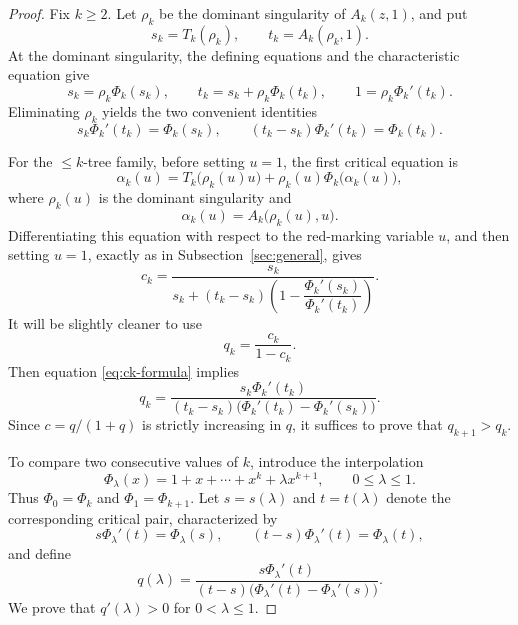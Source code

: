 \documentclass[11pt, onesided]{amsart}
\theoremstyle{remark}
\begin{document}
\begin{proof}
Fix $k\ge2$.  Let $\rho_k$ be the dominant singularity of $A_k(z,1)$, and put
\[
s_k=T_k(\rho_k),
\qquad
t_k=A_k(\rho_k,1).
\]
At the dominant singularity, the defining equations and the characteristic equation give
\begin{equation}
\label{eq:bounded-critical}
s_k=\rho_k\Phi_k(s_k),
\qquad
t_k=s_k+\rho_k\Phi_k(t_k),
\qquad
1=\rho_k\Phi_k'(t_k).
\end{equation}
Eliminating $\rho_k$ yields the two convenient identities
\begin{equation}
\label{eq:bounded-critical2}
s_k\Phi_k'(t_k)=\Phi_k(s_k),
\qquad
(t_k-s_k)\Phi_k'(t_k)=\Phi_k(t_k).
\end{equation}

For the $\leq k$-tree family, before setting $u=1$, the first critical equation is
\[
\alpha_k(u)
=
T_k\bigl(\rho_k(u)u\bigr)
+
\rho_k(u)\Phi_k\bigl(\alpha_k(u)\bigr),
\]
where $\rho_k(u)$ is the dominant singularity and
\[
\alpha_k(u)=A_k\bigl(\rho_k(u),u\bigr).
\]
Differentiating this equation with respect to the red-marking variable $u$, and then setting $u=1$, exactly as in Subsection~\ref{sec:general}, gives
\begin{equation}
\label{eq:ck-formula}
c_k=
\frac{s_k}
{s_k+(t_k-s_k)\left(1-\dfrac{\Phi_k'(s_k)}{\Phi_k'(t_k)}\right)}.
\end{equation}
It will be slightly cleaner to use
\[
q_k=\frac{c_k}{1-c_k}.
\]
Then equation \eqref{eq:ck-formula} implies
\begin{equation}
\label{eq:qk-formula}
q_k=
\frac{s_k\Phi_k'(t_k)}
{(t_k-s_k)\bigl(\Phi_k'(t_k)-\Phi_k'(s_k)\bigr)}.
\end{equation}
Since $c=q/(1+q)$ is strictly increasing in $q$, it suffices to prove that $q_{k+1}>q_k$.

To compare two consecutive values of $k$, introduce the interpolation
\[
\Phi_\lambda(x)=1+x+\cdots+x^k+\lambda x^{k+1},
\qquad 0\le\lambda\le1.
\]
Thus $\Phi_0=\Phi_k$ and $\Phi_1=\Phi_{k+1}$.  Let $s=s(\lambda)$ and $t=t(\lambda)$ denote the corresponding critical pair, characterized by
\begin{equation}
\label{eq:lambda-critical}
s\Phi_\lambda'(t)=\Phi_\lambda(s),
\qquad
(t-s)\Phi_\lambda'(t)=\Phi_\lambda(t),
\end{equation}
and define
\[
q(\lambda)=
\frac{s\Phi_\lambda'(t)}
{(t-s)\bigl(\Phi_\lambda'(t)-\Phi_\lambda'(s)\bigr)}.
\]
We prove that $q'(\lambda)>0$ for $0<\lambda\le1$.


\end{proof}
\end{document}
